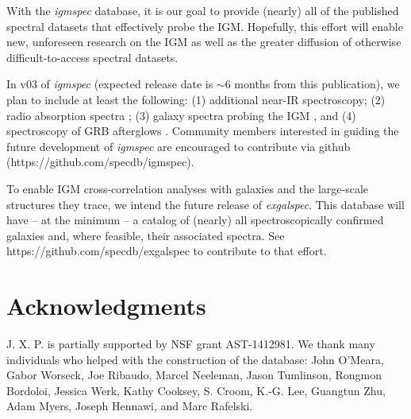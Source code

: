 \documentclass[12pt]{elsarticle}
\begin{document}
With the {\it igmspec} database, it is our goal to provide (nearly)
all of the published spectral datasets that effectively
probe the IGM.  Hopefully, this effort will
enable new, unforeseen research on the IGM as well
as the greater diffusion of otherwise difficult-to-access spectral
datasets.  

In v03 of
{\it igmspec} (expected release date is $\sim 6$ months from
this publication), we plan to include at least the following:
(1) additional near-IR spectroscopy;
(2) radio absorption spectra \citep[e.g. 21\,cm;][]{kanekar+14};
(3) galaxy spectra probing the IGM \citep[e.g.][]{rpk+10}, 
and
(4) spectroscopy of GRB afterglows \citep[e.g.][]{fjp+09}.
Community members interested in guiding the future development
of {\it igmspec} are encouraged to contribute via github
(https://github.com/specdb/igmspec).

To enable IGM cross-correlation analyses with galaxies
and the large-scale structures they trace,
we intend the future release of {\it exgalspec}.
This database will have -- at
the minimum -- a catalog of (nearly) all spectroscopically
confirmed galaxies and, where feasible, their associated
spectra.  See https://github.com/specdb/exgalspec
to contribute to that effort.


\section{Acknowledgments}

J. X. P. is partially supported by NSF grant AST-1412981.
We thank many individuals who helped with the construction
of the database:
John O'Meara, Gabor Worseck, Joe Ribaudo, Marcel Neeleman,
Jason Tumlinson, Rongmon Bordoloi, Jessica Werk,
Kathy Cooksey, S. Croom, K.-G. Lee, Guangtun Zhu,
Adam Myers, Joseph Hennawi,  and Marc Rafelski.



%
%
%
\end{document}
